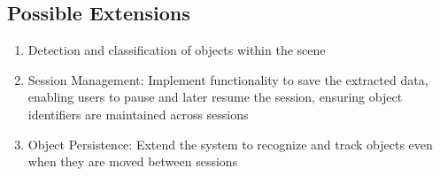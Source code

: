 \subsection*{Possible Extensions}
\begin{enumerate}
  \item Detection and classification of objects within the scene
  \item Session Management: Implement functionality to save the extracted data, enabling users to pause and later resume the session, ensuring object identifiers are maintained across sessions
  \item Object Persistence: Extend the system to recognize and track objects even when they are moved between sessions
\end{enumerate}


\thispagestyle{empty}
\clearpage
